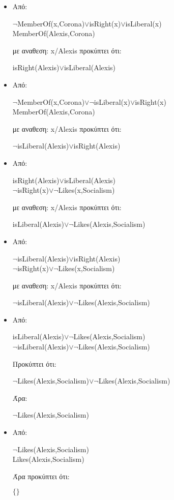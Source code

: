 \documentclass[12pt,a4paper]{article}
\begin{document}
\begin{itemize}
\item Από:\begin{center}
$\neg$\textlatin{MemberOf(x,Corona)$\vee$isRight(x)$\vee$isLiberal(x)\\
MemberOf(Alexis,Corona)}
\end{center} με αναθεση: \textlatin{x/Alexis} προκύπτει ότι: \begin{center}
\textlatin{isRight(Alexis)$\vee$isLiberal(Alexis)}
\end{center}
\item Από:\begin{center}
\textlatin{
$\neg$MemberOf(x,Corona)$\vee\neg$isLiberal(x)$\vee$isRight(x)\\
MemberOf(Alexis,Corona)}
\end{center} με αναθεση: \textlatin{x/Alexis} προκύπτει ότι: \begin{center}
\textlatin{$\neg$isLiberal(Alexis)$\vee$isRight(Alexis)}
\end{center}
\item Από:\begin{center}
\textlatin{isRight(Alexis)$\vee$isLiberal(Alexis)}\\
\textlatin{$\neg$isRight(x)$\vee\neg$Likes(x,Socialism)}
\end{center}
 με αναθεση: \textlatin{x/Alexis} προκύπτει ότι: \begin{center}
\textlatin{isLiberal(Alexis)$\vee\neg$Likes(Alexis,Socialism)}
\end{center}
\item Από:\begin{center}
\textlatin{$\neg$isLiberal(Alexis)$\vee$isRight(Alexis)}\\
\textlatin{$\neg$isRight(x)$\vee\neg$Likes(x,Socialism)}
\end{center}
 με αναθεση: \textlatin{x/Alexis} προκύπτει ότι: \begin{center}
\textlatin{$\neg$isLiberal(Alexis)$\vee\neg$Likes(Alexis,Socialism)}
\end{center}
\item Από:\begin{center}
\textlatin{isLiberal(Alexis)$\vee\neg$Likes(Alexis,Socialism)\\
$\neg$isLiberal(Alexis)$\vee\neg$Likes(Alexis,Socialism)}
\end{center}
Προκύπτει ότι:\begin{center}
\textlatin{$\neg$Likes(Alexis,Socialism)$\vee\neg$Likes(Alexis,Socialism)}
\end{center}
Άρα:\begin{center}
\textlatin{$\neg$Likes(Alexis,Socialism)}
\end{center}
\item Από: \begin{center}
\textlatin{$\neg$Likes(Alexis,Socialism)\\
Likes(Alexis,Socialism)}
\end{center}
Άρα προκύπτει ότι:\begin{center}
$\{\}$
\end{center}
\end{itemize}
\end{document}
